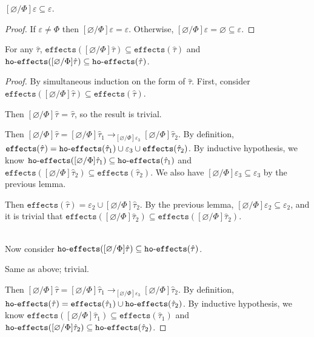 \documentclass{llncs}
\newcommand{\keywadj}[1]{\mathtt{#1}}
\newcommand{\keyw}[1]{\keywadj{#1}~}
\newcommand{\kw}[1]{\keyw{ #1 }}
\newcommand{\kwa}[1]{\keywadj{ #1 }}
\newcommand{\hyphen}{\hbox{-}}
\newcommand{\fx}[1]{ \kwa{effects}(#1) }
\newcommand{\hofx}[1]{ \kwa{ho \hyphen effects}(#1) }
\begin{document}
\hrulefill

\begin{lemma}
$[\varnothing/\Phi]\varepsilon \subseteq \varepsilon$.
\end{lemma}

\begin{proof}
If $\varepsilon \neq \Phi$ then $[\varnothing/\Phi]\varepsilon = \varepsilon$. Otherwise, $[\varnothing/\Phi]\varepsilon = \varnothing \subseteq \varepsilon$.
\end{proof}

\begin{lemma}
For any $\hat \tau$, $\fx{[\varnothing/\Phi]\hat \tau} \subseteq \fx{\hat \tau}$ and $\hofx{[\varnothing/\Phi]\hat \tau} \subseteq \hofx{\hat \tau}$.
\end{lemma}

\begin{proof} By simultaneous induction on the form of $\hat \tau$. First, consider $\fx{[\varnothing/\Phi]\hat \tau} \subseteq \fx{\hat \tau}$.

 Then $[\varnothing/\Phi]\hat \tau$ = $\hat \tau$, so the result is trivial.

 Then $[\varnothing/\Phi]\hat \tau = [\varnothing/\Phi]\hat \tau_1 \rightarrow_{[\varnothing/\Phi]\varepsilon_3} [\varnothing/\Phi]\hat \tau_2$. By definition, $\fx{\hat \tau} = \hofx{\hat \tau_1} \cup \varepsilon_3 \cup \fx{\hat \tau_2}$. By inductive hypothesis, we know $\hofx{[\varnothing/\Phi]\hat \tau_1} \subseteq \hofx{\hat \tau_1}$ and $\fx{[\varnothing/\Phi]\hat \tau_2} \subseteq \fx{\hat \tau_2}$. We also have $[\varnothing/\Phi]\varepsilon_3 \subseteq \varepsilon_3$ by the previous lemma.

\fbox{$\hat \tau = \forall \Phi \subseteq \varepsilon_1. \hat \tau_2~\kw{caps} \varepsilon_2$.} Then $\fx{\hat \tau} = \varepsilon_2 \cup [\varnothing/\Phi]\hat \tau_2$. By the previous lemma, $[\varnothing/\Phi]\varepsilon_2 \subseteq \varepsilon_2$, and it is trivial that $\fx{[\varnothing/\Phi]\hat \tau_2} \subseteq \fx{[\varnothing/\Phi]\hat \tau_2}$.

\\

\noindent
Now consider $\hofx{[\varnothing/\Phi]\hat \tau} \subseteq \hofx{\hat \tau}$.

 Same as above; trivial.

 Then $[\varnothing/\Phi]\hat \tau = [\varnothing/\Phi]\hat \tau_1 \rightarrow_{[\varnothing/\Phi]\varepsilon_3} [\varnothing/\Phi]\hat \tau_2$. By definition, $\hofx{\hat \tau} = \fx{\hat \tau_1} \cup \hofx{\hat \tau_2}$. By inductive hypothesis, we know $\fx{[\varnothing/\Phi]\hat \tau_1} \subseteq \fx{\hat \tau_1}$ and $\hofx{[\varnothing/\Phi]\hat \tau_2} \subseteq \hofx{\hat \tau_2}$.


\end{proof}
\end{document}
